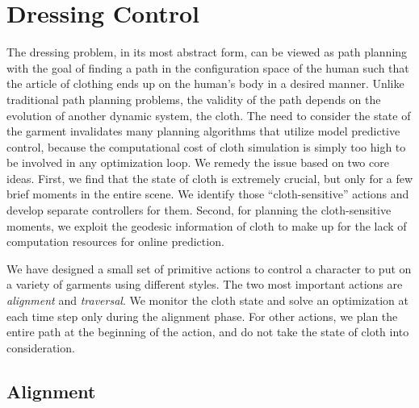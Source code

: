 \section{Dressing Control}

The dressing problem, in its most abstract form, can be viewed as path
planning with the goal of finding a path in the configuration space of the
human such that the article of clothing ends up on the human's body in a
desired manner. Unlike traditional path planning problems, the validity of
the path depends on the evolution of another dynamic system, the cloth. The
need to consider the state of the garment invalidates many planning
algorithms that utilize model predictive control, because the
computational cost of cloth simulation is simply too high to be involved
in any optimization loop. We remedy the issue based on two core ideas.
First, we find that the state of cloth is extremely crucial, but only for
a few brief moments in the entire scene. We identify those
``cloth-sensitive'' actions and develop separate controllers for them.
Second, for planning the cloth-sensitive moments, we exploit the geodesic
information of cloth to make up for the lack of computation resources for
online prediction.

We have designed a small set of primitive actions to control a character to put on a variety of garments using different styles. The two most important actions are \emph{alignment} and \emph{traversal}. We monitor the cloth state and solve an optimization at each time step only during the alignment phase. For other actions, we plan the entire path at the beginning of the action, and do not take the state of cloth into consideration.



\subsection{Alignment}

